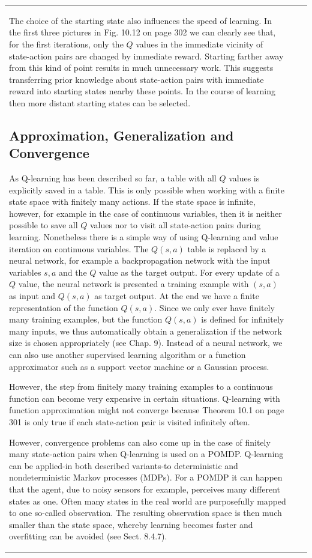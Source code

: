 \documentclass[10pt]{book}
\begin{document}
\begin{center}
\begin{tabular}{|l|l|l|}
The choice of the starting state also influences the speed of learning. In the first three pictures in Fig. 10.12 on page 302 we can clearly see that, for the first iterations, only the $Q$ values in the immediate vicinity of state-action pairs are changed by immediate reward. Starting farther away from this kind of point results in much unnecessary work. This suggests transferring prior knowledge about state-action pairs with immediate reward into starting states nearby these points. In the course of learning then more distant starting states can be selected.

\subsection{Approximation, Generalization and Convergence}
As Q-learning has been described so far, a table with all $Q$ values is explicitly saved in a table. This is only possible when working with a finite state space with finitely many actions. If the state space is infinite, however, for example in the case of continuous variables, then it is neither possible to save all $Q$ values nor to visit all state-action pairs during learning.
Nonetheless there is a simple way of using Q-learning and value iteration on continuous variables. The $Q(s, a)$ table is replaced by a neural network, for example a backpropagation network with the input variables $s, a$ and the $Q$ value as the target output. For every update of a $Q$ value, the neural network is presented a training example with $(s, a)$ as input and $Q(s, a)$ as target output. At the end we have a finite representation of the function $Q(s, a)$. Since we only ever have finitely many training examples, but the function $Q(s, a)$ is defined for infinitely many inputs, we thus automatically obtain a generalization if the network size is chosen appropriately (see Chap. 9). Instead of a neural network, we can also use another supervised learning algorithm or a function approximator such as a support vector machine or a Gaussian process.

However, the step from finitely many training examples to a continuous function can become very expensive in certain situations. Q-learning with function approximation might not converge because Theorem 10.1 on page 301 is only true if each state-action pair is visited infinitely often.

However, convergence problems can also come up in the case of finitely many state-action pairs when Q-learning is used on a POMDP. Q-learning can be applied-in both described variants-to deterministic and nondeterministic Markov processes (MDPs). For a POMDP it can happen that the agent, due to noisy sensors for example, perceives many different states as one. Often many states in the real world are purposefully mapped to one so-called observation. The resulting observation space is then much smaller than the state space, whereby learning becomes faster and overfitting can be avoided (see Sect. 8.4.7).


\end{tabular}
\end{center}
\end{document}
